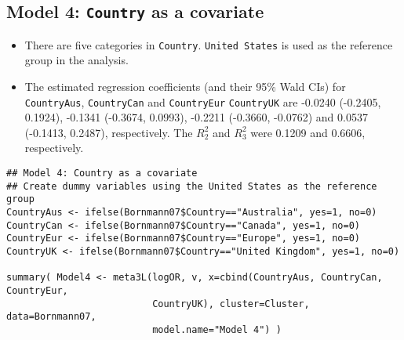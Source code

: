 \documentclass[11pt]{article}
\begin{document}
\subsection{Model 4: \texttt{Country} as a covariate}
\label{sec:orgb28720f}
\begin{itemize}
\item There are five categories in \texttt{Country}. \texttt{United States} is used as the reference group in the analysis.
\item The estimated regression coefficients (and their 95\% Wald CIs) for \texttt{CountryAus}, \texttt{CountryCan} and \texttt{CountryEur} \texttt{CountryUK} are -0.0240 (-0.2405, 0.1924), -0.1341 (-0.3674, 0.0993), -0.2211 (-0.3660, -0.0762) and 0.0537 (-0.1413, 0.2487), respectively. The \(R^2_2\) and \(R^2_3\) were 0.1209 and 0.6606, respectively.
\end{itemize}
\begin{verbatim}
## Model 4: Country as a covariate
## Create dummy variables using the United States as the reference group
CountryAus <- ifelse(Bornmann07$Country=="Australia", yes=1, no=0)
CountryCan <- ifelse(Bornmann07$Country=="Canada", yes=1, no=0)
CountryEur <- ifelse(Bornmann07$Country=="Europe", yes=1, no=0)
CountryUK <- ifelse(Bornmann07$Country=="United Kingdom", yes=1, no=0)

summary( Model4 <- meta3L(logOR, v, x=cbind(CountryAus, CountryCan, CountryEur, 
                          CountryUK), cluster=Cluster, data=Bornmann07,
                          model.name="Model 4") )  
\end{verbatim}
\end{document}

